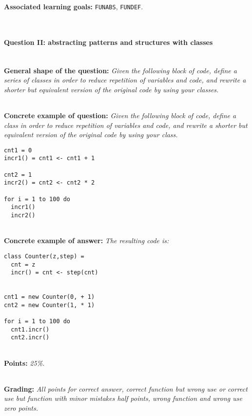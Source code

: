 \textbf{Associated learning goals:} \texttt{FUNABS}, \texttt{FUNDEF}.

\ \\ 

\paragraph{Question II: abstracting patterns and structures with classes} \ \\

\textbf{General shape of the question:} \textit{Given the following block of code, define a series of classes in order to reduce repetition of variables and code, and rewrite a shorter but equivalent version of the original code by using your classes.}

\ \\ 

\textbf{Concrete example of question:} \textit{Given the following block of code, define a class in order to reduce repetition of variables and code, and rewrite a shorter but equivalent version of the original code by using your class.}

\begin{lstlisting}
cnt1 = 0
incr1() = cnt1 <- cnt1 + 1

cnt2 = 1
incr2() = cnt2 <- cnt2 * 2

for i = 1 to 100 do
  incr1()
  incr2()
\end{lstlisting}

\ \\ 

\textbf{Concrete example of answer:} \textit{The resulting code is:}

\begin{lstlisting}
class Counter(z,step) =
  cnt = z
  incr() = cnt <- step(cnt)


cnt1 = new Counter(0, + 1)
cnt2 = new Counter(1, * 1)

for i = 1 to 100 do
  cnt1.incr()
  cnt2.incr()
\end{lstlisting}

\ \\ 

\textbf{Points:} \textit{25\%.}

\ \\ 

\textbf{Grading:} \textit{All points for correct answer, correct function but wrong use or correct use but function with minor mistakes half points, wrong function and wrong use zero points.}


